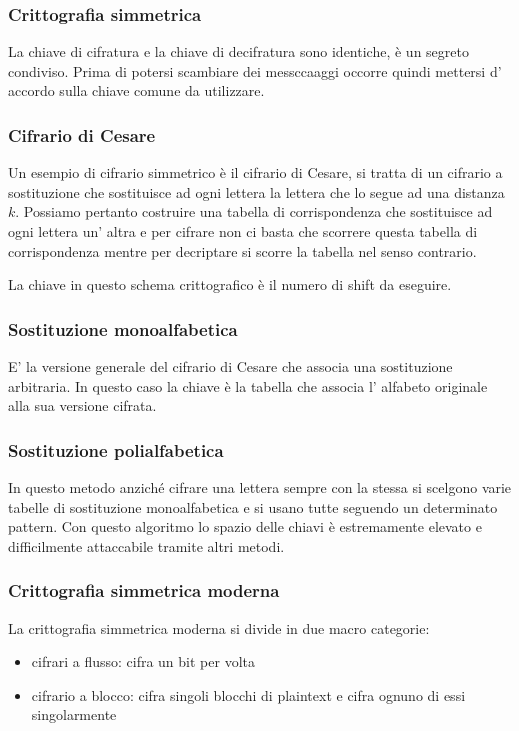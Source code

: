 \subsubsection{Crittografia simmetrica}
La chiave di cifratura e la chiave di decifratura sono identiche, è un segreto condiviso.
Prima di potersi scambiare dei messccaaggi occorre quindi mettersi d' accordo sulla chiave comune da utilizzare.

\subsubsection{Cifrario di Cesare}
Un esempio di cifrario simmetrico è il cifrario di Cesare, si tratta di un cifrario a sostituzione che sostituisce ad ogni lettera la lettera che lo segue ad una distanza $k$.
Possiamo pertanto costruire una tabella di corrispondenza che sostituisce ad ogni lettera un' altra e per cifrare non ci basta che scorrere questa tabella di corrispondenza mentre per decriptare si scorre la tabella nel senso contrario.

La chiave in questo schema crittografico è il numero di shift da eseguire.

\subsubsection{Sostituzione monoalfabetica}
E' la versione generale del cifrario di Cesare che associa una sostituzione arbitraria.
In questo caso la chiave è la tabella che associa l' alfabeto originale alla sua versione cifrata.

\subsubsection{Sostituzione polialfabetica}
In questo metodo anziché cifrare una lettera sempre con la stessa si scelgono varie tabelle di sostituzione monoalfabetica e si usano tutte seguendo un determinato pattern.
Con questo algoritmo lo spazio delle chiavi è estremamente elevato e difficilmente attaccabile tramite altri metodi.

\subsubsection{Crittografia simmetrica moderna}
La crittografia simmetrica moderna si divide in due macro categorie:
\begin{itemize}
    \item cifrari a flusso: cifra un bit per volta
    \item cifrario a blocco: cifra singoli blocchi di plaintext e cifra ognuno di essi singolarmente
\end{itemize}

